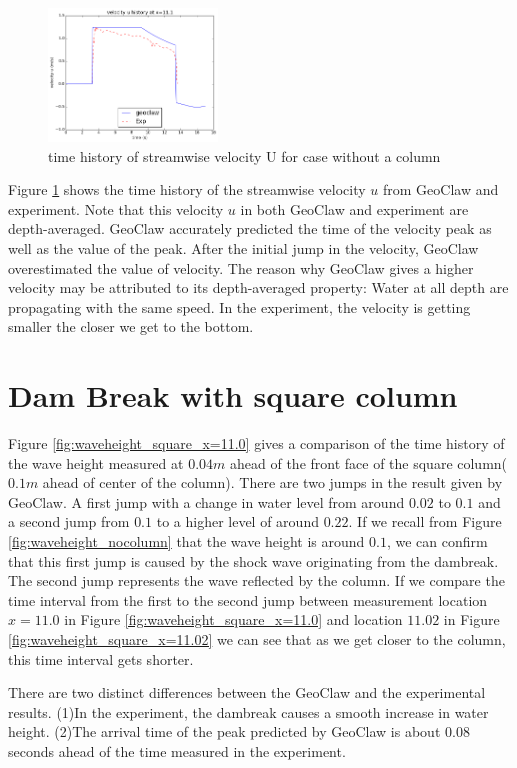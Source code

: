 \documentclass[11pt]{article}
\begin{document}
\begin{figure}[h!]
    \centering
    \includegraphics[width=0.4\textwidth]{./plots/velocityU_nocolumn}
    \caption{time history of streamwise velocity U for case without a column}
    \label{fig:velocityU_nocolumn}
\end{figure}
Figure \ref{fig:velocityU_nocolumn} shows the time history of the streamwise velocity $u$ from GeoClaw and experiment. 
Note that this velocity $u$ in both GeoClaw and experiment are depth-averaged. 
GeoClaw accurately predicted the time of the velocity peak as well as the value of the peak. 
After the initial jump in the velocity, GeoClaw overestimated the value of velocity.
The reason why GeoClaw gives a higher velocity may be attributed to its depth-averaged property: Water at all depth are propagating with the same speed. In the experiment, the velocity is getting smaller the closer we get to the bottom. 

\section{Dam Break with square column}\label{Sec:Square}
Figure \ref{fig:waveheight_square_x=11.0} gives a comparison of the time history of the wave height measured at $0.04m$ ahead of the front face of the square column($0.1m$ ahead of center of the column).
There are two jumps in the result given by GeoClaw. A first jump with a change in water level from around $0.02$ to $0.1$ and a second jump from $0.1$ to a higher level of around $0.22$.
If we recall from Figure \ref{fig:waveheight_nocolumn} that the wave height is around $0.1$, we can confirm that this first jump is caused by the shock wave originating from the dambreak. The second jump represents the wave reflected by the column.  
If we compare the time interval from the first to the second jump between measurement location $x=11.0$ in Figure \ref{fig:waveheight_square_x=11.0} and location $11.02$ in Figure \ref{fig:waveheight_square_x=11.02} we can see that as we get closer to the column, this time interval gets shorter.
\par
There are two distinct differences between the GeoClaw and the experimental results. (1)In the experiment, the dambreak causes a smooth increase in water height. (2)The arrival time of the peak predicted by GeoClaw is about $0.08$ seconds ahead of the time measured in the experiment.  
\par
\end{document}
